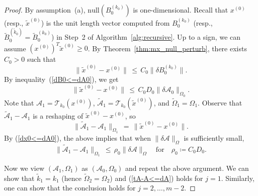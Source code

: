\documentclass{amsart}
\newcommand{\dt}{\delta}
\newcommand{\tomg}{\widetilde{\Omega}}
\newcommand{\tx}{\tilde{x}}
\newcommand{\tk}{\tilde{k}}
\newcommand{\reff}[1]{(\ref{#1})}
\newcommand{\mc}[1]{\mathcal{#1}}
\newcommand{\ddd}{,\ldots,}
\newcommand{\be}{\begin{equation}}
\newcommand{\ee}{\end{equation}}
\theoremstyle{definition}
\numberwithin{equation}{section}
\begin{document}
\begin{proof}
By assumption~(a), $\text{null}(B_0^{(k_0)})$ is one-dimensional.
Recall that $x^{(0)}$ (resp., $\tx^{(0)}$) is the unit length vector computed from $B_0^{(k_0)}$
(resp., $\widetilde{B}_0^{(\tk_0)} = \widetilde{B}_0^{(k_0)}$) in Step~2 of Algorithm~\ref{alg:recursive}.
Up to a sign, we can assume $(x^{(0)})^T\tx^{(0)} \ge 0$.
By Theorem~\ref{thm:mx_null_perturb}, there exists $C_0 > 0$ such that
\[
\|\tx^{(0)} - x^{(0)}\| \,\le\, C_0 \|\dt B_0^{(k_0)}\|.
\]
By inequality~\reff{dB0<=dA0}, we get
\be\label{dx0<=dA0}
\|\tx^{(0)} - x^{(0)}\| \,\le\, C_0D_0 \|\dt \mc{A}_0 \|_{\Omega_0}.
\ee
Note that
$\mc{A}_1 = \mc{T}_{k_0}(x^{(0)})$,
$\widetilde{\mc{A}}_1 = \mc{T}_{k_0}(\tx^{(0)})$,
and $\tomg_1 = \Omega_1$.
Observe that $\widetilde{\mc{A}}_1 - \mc{A}_1$ is a reshaping of $\tx^{(0)} - x^{(0)}$, so
\[
\| \widetilde{\mc{A}}_1 - \mc{A}_1 \|_{\Omega_1} \,=\, \|\tx^{(0)} - x^{(0)}\|.
\]
By \reff{dx0<=dA0}, the above implies that when $\|\dt \mc{A}\|_{\Omega}$ is sufficiently small,
\be\label{dA1<=rho0dA0}
\| \widetilde{\mc{A}}_1 - \mc{A}_1 \|_{\Omega_1} \,\le\, \rho_0 \|\dt \mc{A} \|_{\Omega}
\quad \text{for} \quad \rho_0 \coloneqq C_0D_0.
\ee





Now we view $(\mc{A}_1, \Omega_1)$ as $(\mc{A}_0, \Omega_0)$ and repeat the above argument.
We can show that $\tk_1 = k_1$ (hence $\tomg_2 = \Omega_2$) and \reff{tA-A<=dA} holds for $j=1$.
Similarly, one can show that the conclusion holds for $j = 2 \ddd m-2$.











\end{proof}
\end{document}
